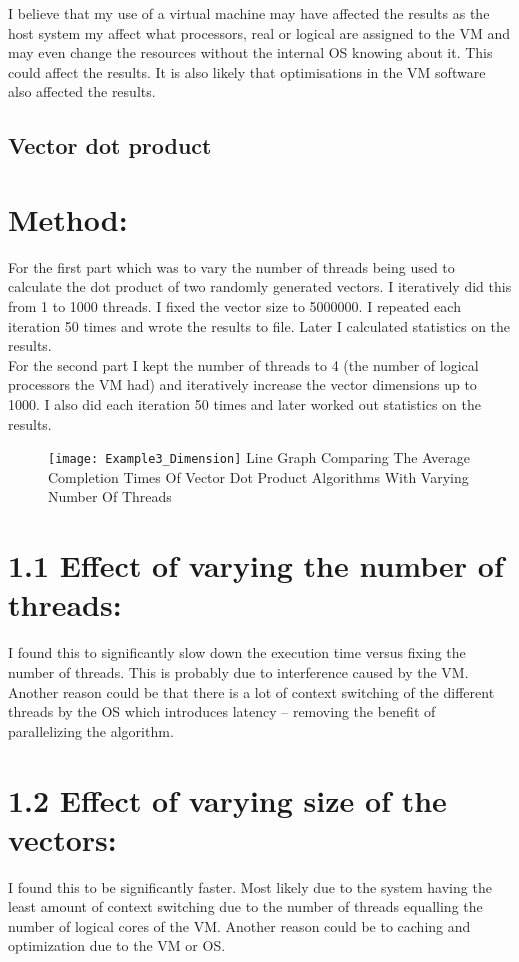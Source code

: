 \documentclass[11pt]{article}
\begin{document}
\begin{page}
\noindent I believe that my use of a virtual machine may have affected the results as the host system my affect what processors, real or logical are assigned to the VM and may even change the resources without the internal OS knowing about it. This could affect the results. It is also likely that optimisations in the VM software also affected the results.


\section{Vector dot product}
\noindent \chapter{Method:}
For the first part which was to vary the number of threads being used to calculate the dot product of two randomly generated vectors. I iteratively did this from 1 to 1000 threads. I fixed the vector size to 5000000. I repeated each iteration 50 times and wrote the results to file. Later I calculated statistics on the results.\\

\noindent For the second part I kept the number of threads to 4 (the number of logical processors the VM had) and iteratively increase the vector dimensions up to 1000. I also did each iteration 50 times and later worked out statistics on the results.

\begin{figure}[ht]
\centering
     \texttt{[image: Example3\_Dimension]}
     Line Graph Comparing The Average Completion Times Of Vector Dot Product Algorithms With Varying Number Of Threads\\
\end{figure}

\noindent \chapter{1.1	Effect of varying the number of threads:}
I found this to significantly slow down the execution time versus fixing the number of threads. This is probably due to interference caused by the VM. Another reason could be that there is a lot of context switching of the different threads by the OS which introduces latency – removing the benefit of parallelizing the algorithm.\\

\noindent \chapter{1.2	Effect of varying size of the vectors:}
I found this to be significantly faster. Most likely due to the system having the least amount of context switching due to the number of threads equalling the number of logical cores of the VM. Another reason could be to caching and optimization due to the VM or OS.\\


\end{page}
\end{document}
